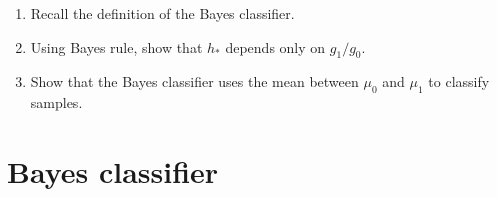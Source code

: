 \documentclass[a4paper,10pt,fleqn]{article}
\newcommand{\eqsp}{\,}
\newcommand{\rset}{\ensuremath{\mathbb{R}}}
\newcommand{\bP}{\mathbb{P}}
\newcommand{\1}{\ensuremath{\mathbbm{1}}}
\begin{document}
\begin{enumerate}
\item Recall the definition of the Bayes classifier.
%
%

\item Using Bayes rule, show that  $h_*$ depends only on $g_1/g_0$.
%
%

\item Show that the Bayes classifier uses the mean between  $\mu_0$ and  $\mu_1$ to classify samples.
%
%
\end{enumerate}



\section{Bayes classifier}
\end{document}
